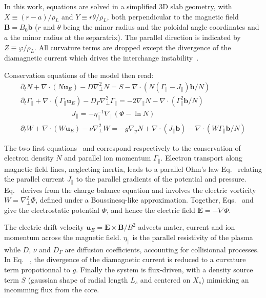 \documentclass[cpp,a4paper,fleqn,twoside%
]{w-art}
\makeatletter
\renewcommand*{\eqref}[1]{%
  \hyperref[{#1}]{\textup{\tagform@{\ref*{#1}}}}%
}
\makeatother
\begin{document}
In this work, equations are solved in a simplified 3D
slab geometry, with $X\equiv(r-a)/\rho_L$ and $Y\equiv r\theta/\rho_L$, both
perpendicular to the magnetic field $\mathbf B=B_0\mathbf b$ ($r$ and $\theta$
being the minor radius and the poloidal angle coordinates and $a$ the minor
radius at the separatrix). The parallel direction is indicated by
$Z\equiv\varphi/\rho_L$. All curvature terms are dropped except the divergence
of the diamagnetic current which drives the interchange instability~\cite{Ghendrih03}.

\vspace{2mm}
Conservation equations of the model then read:
\begin{gather}
  \partial_t N + \nabla \cdot \left(N\mathbf{u}_E \right) 
  -D\nabla_\perp^2 N  =  S - \nabla \cdot \left(N(\Gamma_\parallel
  - J_\parallel)\mathbf{b}/N\right)
  \label{eq_particle_balance}
  \\
  \partial_t \Gamma_\parallel + \nabla \cdot \left(\Gamma_\parallel \mathbf{u}_E
  \right) -D_\Gamma \nabla_\perp^2 \Gamma_\parallel  =  - 2
  \nabla_\parallel N -\nabla \cdot \left( \Gamma^2_\parallel\mathbf{b}/N\right)
  \label{eq_momentum_balance}
  \\
\phantom{\hspace{3cm}} J_\parallel = 
-\eta_\parallel^{-1}\nabla_\parallel\left(\Phi - \ln N\right)
  \label{eq_Ohms_law}
  \\
  \partial_t W + \nabla \cdot \left( W \mathbf{u}_E \right)- \nu
  \nabla_\perp^2 W  =  -g\nabla_y N + \nabla \cdot \left( J_\parallel
  \mathbf{b} \right) -\nabla \cdot \left( W \Gamma_\parallel\mathbf{b}/N
  \right)
  \label{eq_charge_balance}
\end{gather}


The two first equations~\eqref{eq_particle_balance} and
\eqref{eq_momentum_balance} correspond respectively to the conservation of
electron density $N$ and parallel ion momentum $\Gamma_\parallel$. Electron
transport along magnetic field lines, neglecting inertia, leads to a parallel
Ohm's law Eq.~\eqref{eq_Ohms_law} relating the parallel current $J_\parallel$ to
the parallel gradients of the potential and pressure.
Eq.~\eqref{eq_charge_balance} derives from the charge balance equation and
involves the electric vorticity $W=\nabla^2_\perp\Phi$, defined under a
Boussinesq-like approximation. Together, Eqs.~\eqref{eq_Ohms_law} and
\eqref{eq_charge_balance} give the electrostatic potential $\Phi$, and hence the
electric field $\mathbf E=-\nabla\Phi$. 

The electric drift velocity $\mathbf{u}_E=\mathbf E\times\mathbf B/B^2$ advects
mater, current and ion momentum across the magnetic field. $\eta_\parallel$ is the parallel
resistivity of the plasma while $D$, $\nu$ and $D_\Gamma$ are diffusion
coefficients, accounting for collisionnal processes. In
Eq.~\eqref{eq_charge_balance}, the divergence of the diamagnetic current is
reduced to a curvature term propotionnal to $g$. Finally the system
is flux-driven, with a density source term $S$ (gaussian shape of radial length
$L_s$ and centered on $X_s$)
mimicking an incomming flux from the core.
\end{document}

